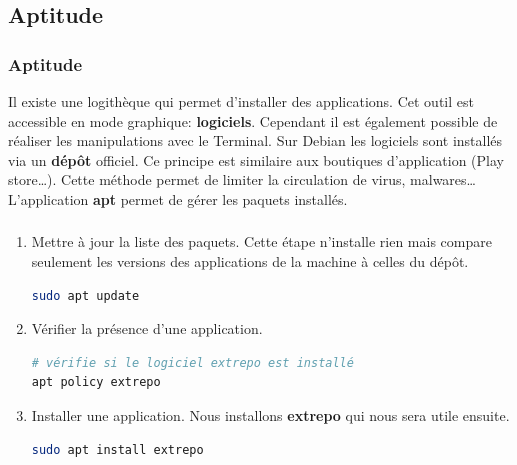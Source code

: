 \documentclass[svgnames,11pt]{beamer}
\begin{document}
\subsection{Aptitude}
\begin{frame}
    \frametitle{Aptitude}

    Il existe une logithèque qui permet d'installer des applications. Cet outil est accessible en mode graphique: \textbf{logiciels}. Cependant il est également possible de réaliser les manipulations avec le Terminal. Sur Debian les logiciels sont installés via un \textbf{dépôt} officiel. Ce principe est similaire aux boutiques d'application (Play store\dots). Cette méthode permet de limiter la circulation de virus, malwares\dots L'application \textbf{apt} permet de gérer les paquets installés.

\end{frame}
\begin{frame}[fragile]
    \frametitle{}
\begin{activite}
\begin{enumerate}
\item Mettre à jour la liste des paquets. Cette étape n'installe rien mais compare seulement les versions des applications de la machine à celles du dépôt.
\begin{lstlisting}[language=bash, basicstyle=\ttfamily\small, xleftmargin=2em, xrightmargin=2em]
sudo apt update
\end{lstlisting}
\item Vérifier la présence d'une application.
\begin{lstlisting}[language=bash, basicstyle=\ttfamily\small, xleftmargin=2em, xrightmargin=2em]
# vérifie si le logiciel extrepo est installé
apt policy extrepo
\end{lstlisting}
\item Installer une application. Nous installons \textbf{extrepo} qui nous sera utile ensuite.
\begin{lstlisting}[language=bash, basicstyle=\ttfamily\small, xleftmargin=2em, xrightmargin=2em]
sudo apt install extrepo
\end{lstlisting}
\end{enumerate}
\end{activite}

\end{frame}
\end{document}
